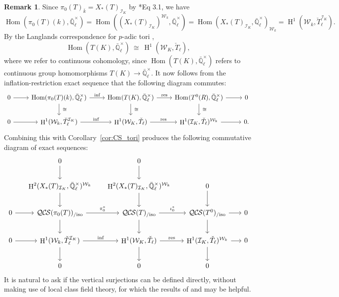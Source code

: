 \documentclass[10pt]{amsart}
\theoremstyle{plain}
\theoremstyle{definition}
\newtheorem{remark}[theorem]{Remark}
\newcommand{\EE}{\mathbb{\bar Q}_\ell}
\newcommand{\bFq}{\bar{k}}
\newcommand{\Fq}{k}
\newcommand{\EEx}{\EE^\times}
\newcommand{\Weil}[1]{\mathcal{W}_{#1}}
\DeclareMathOperator{\Hom}{Hom}
\DeclareMathOperator{\Hh}{H}
\newcommand{\iso}{{\ \cong\ }}
\newcommand{\QCS}{{\mathcal{QC\hskip-0.8pt S}}}
\newcommand{\QCSiso}[1]{\QCS(#1)_{/\text{iso}}}
\begin{document}
\begin{remark}
Since $\pi_0(T)_{\bFq} = X_*(T)_{\mathcal{I}_K}$ by \cite{bitan:discriminant}*{Eq 3.1}, we have
\[\Hom(\pi_0(T)(\Fq), \EEx)
= \Hom((X_*(T)_{\mathcal{I}_K})^{\Weil{\Fq}}, \EEx)
= \Hom(X_*(T)_{\mathcal{I}_K}, \EEx)_{\Weil{\Fq}} 
= \Hh^1(\Weil{\Fq}, \check{T}_\ell^{\mathcal{I}_K}).
\]
By the Langlands correspondence for $p$-adic tori \cite{yu:09a}, 
\[
\Hom(T(K), \EEx) 
\iso 
\Hh^1(\Weil{K}, \check{T}_\ell),
\]
where we refer to continuous cohomology, since $\Hom(T(K), \EEx)$ refers to continuous group homomorphisms $T(K)\to \EEx$.
It now follows from the inflation-restriction exact sequence that the following diagram commutes:
\[
\begin{tikzcd}
   0 \arrow{r} & \Hom(\pi_0(T)(\Fq), \EEx) \arrow{r}{\text{inf}} \arrow{d}{\iso}
    & \arrow{d}{\iso} \Hom_\text{}(T(K),\EEx) \arrow{r}{\text{res}} & \Hom_\text{}(T^0(R),\EEx) \arrow{r} \arrow{d}{\iso} & 0\\    
    0 \arrow{r}  
 & \Hh^1(\Weil{\Fq}, \check{T}_\ell^{\mathcal{I}_K}) \arrow{r}{\text{inf}}
 & \Hh^1(\Weil{K}, \check{T}_\ell) \arrow{r}{\text{res}} 
 & \Hh^1(\mathcal{I}_K, \check{T}_\ell)^{\Weil{\Fq}} \arrow{r}  
 & 0.
\end{tikzcd}
\] 
Combining this with Corollary~\ref{cor:CS_tori}  produces the following commutative diagram of exact sequences:
\begin{equation}\label{eq:GLCT}
  \begin{tikzcd}[row sep=20, column sep=15]
{}  & 0 \arrow{d} & 0 \arrow{d} &  & \\ 
   & \Hh^2(X_*(T)_{\mathcal{I}_K},\EEx)^{\Weil{\Fq}}  \arrow{d} & \arrow{d} \Hh^2(X_*(T)_{\mathcal{I}_K},\EEx)^{\Weil{\Fq}} & 0 \arrow{d} & \\
    0 \rar & \QCSiso{\pi_0(T)} \arrow{r}{\pi_0^*} \arrow{d}
    & \QCSiso{T} \arrow{r}{\iota_0^*}  \arrow{d} & \QCSiso{T^0} \arrow{r} \arrow{d} & 0\\
   0 \arrow{r}  
 & \Hh^1(\Weil{\Fq}, \check{T}_\ell^{\mathcal{I}_K}) \arrow{r}{\text{inf}} \arrow{d}
 & \Hh^1(\Weil{K}, \check{T}_\ell) \arrow{r}{\text{res}} \arrow{d}
 & \Hh^1(\mathcal{I}_K, \check{T}_\ell)^{\Weil{\Fq}} \arrow{r} \arrow{d}  
 & 0\\
 &  0  & 0 & 0 & 
  \end{tikzcd}
 \end{equation}
It is natural to ask if the vertical surjections can be defined directly, without making use of local class field theory,
for which the results of \cite{suzuki-yoshida:12a}  and \cite{Suzuki:Neron} may be helpful.

\end{remark}
\end{document}
